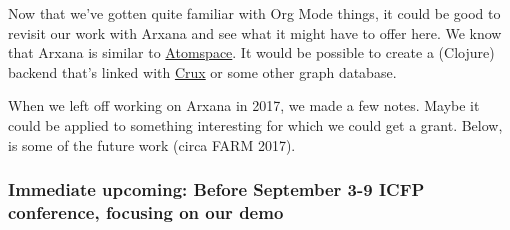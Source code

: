 \documentclass[11pt]{article}
\begin{document}
Now that we’ve gotten quite familiar with Org Mode things, it could be
good to revisit our work with Arxana and see what it might have to
offer here.  We know that Arxana is similar to \href{https://github.com/opencog/atomspace}{Atomspace}.  It would be
possible to create a (Clojure) backend that’s linked with \href{https://github.com/juxt/crux}{Crux} or some
other graph database.

When we left off working on Arxana in 2017, we made a few notes.
Maybe it could be applied to something interesting for which we could
get a grant. Below, is some of the future work (circa FARM 2017).

\subsubsection{Immediate upcoming: Before September 3-9 ICFP conference, focusing on our demo}
\label{sec:org41405eb}
\end{document}

